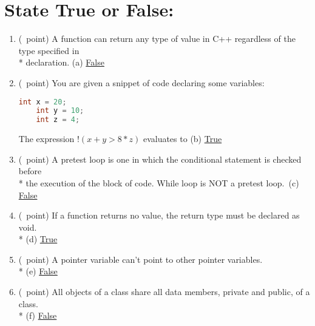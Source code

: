 \documentclass[14pt]{article}
\begin{document}
\section{State True or False:}
\begin{enumerate}[label=\alph*)]
    \item (\textonequarter\ point) A function can return any type of value in C++ regardless of the type specified in \\* declaration.
    \hfill (a) \underline{\hspace{2cm}False\hspace{2cm}}
    
    \item (\textonequarter\ point) You are given a snippet of code declaring some variables:
    \begin{lstlisting}[language=C++, title={Part (b)}]
    int x = 20;
    int y = 10;
    int z = 4;
    \end{lstlisting}
    The expression \underline{$!(x + y > 8*z)$} evaluates to 
    \hfill (b) \underline{\hspace{2cm}True\hspace{2cm}}
    
    \item (\textonequarter\ point) A pretest loop is one in which the conditional statement is checked before \\* the execution of the block of code. While loop is NOT a pretest loop.\ \hfill (c) \underline{\hspace{1cm}False\hspace{1cm}}
    
    \item (\textonequarter\ point) If a function returns no value, the return type must be declared as void. \\*
    \hfill (d) \underline{\hspace{2cm}True\hspace{2cm}}
    
    \item (\textonequarter\ point) A pointer variable can't point to other pointer variables. \\*
    \hfill (e) \underline{\hspace{2cm}False\hspace{2cm}}
    
    \item (\textonequarter\ point) All objects of a class share all data members, private and public, of a class. \\*
    \hfill (f) \underline{\hspace{2cm}False\hspace{2cm}}
    

\end{enumerate}
\end{document}
